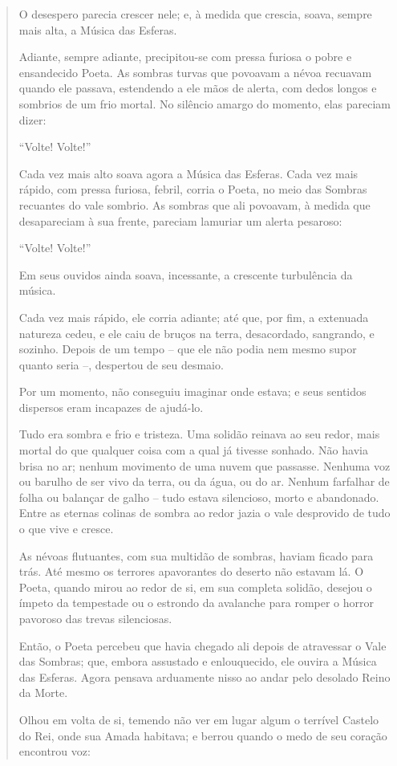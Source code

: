 \begin{verse}
O desespero parecia crescer nele; e, à medida que crescia, soava, sempre
mais alta, a Música das Esferas.

Adiante, sempre adiante, precipitou-se com pressa furiosa o pobre e
ensandecido Poeta. As sombras turvas que povoavam a névoa recuavam
quando ele passava, estendendo a ele mãos de alerta, com dedos longos e
sombrios de um frio mortal. No silêncio amargo do momento, elas pareciam
dizer:

``Volte! Volte!''

Cada vez mais alto soava agora a Música das Esferas. Cada vez mais
rápido, com pressa furiosa, febril, corria o Poeta, no meio das Sombras
recuantes do vale sombrio. As sombras que ali povoavam, à medida que
desapareciam à sua frente, pareciam lamuriar um alerta pesaroso:

``Volte! Volte!''

Em seus ouvidos ainda soava, incessante, a crescente turbulência da
música.

Cada vez mais rápido, ele corria adiante; até que, por fim, a extenuada
natureza cedeu, e ele caiu de bruços na terra, desacordado, sangrando, e
sozinho.
\smallskip
Depois de um tempo -- que ele não podia nem mesmo supor quanto seria --,
despertou de seu desmaio.

Por um momento, não conseguiu imaginar onde estava; e seus sentidos
dispersos eram incapazes de ajudá-lo.

Tudo era sombra e frio e tristeza. Uma solidão reinava ao seu redor,
mais mortal do que qualquer coisa com a qual já tivesse sonhado. Não
havia brisa no ar; nenhum movimento de uma nuvem que passasse. Nenhuma
voz ou barulho de ser vivo da terra, ou da água, ou do ar. Nenhum
farfalhar de folha ou balançar de galho -- tudo estava silencioso,
morto e abandonado. Entre as eternas colinas de sombra ao redor jazia o
vale desprovido de tudo o que vive e cresce.

As névoas flutuantes, com sua multidão de sombras, haviam ficado para
trás. Até mesmo os terrores apavorantes do deserto não estavam lá. O
Poeta, quando mirou ao redor de si, em sua completa solidão, desejou o
ímpeto da tempestade ou o estrondo da avalanche para romper o horror
pavoroso das trevas silenciosas.

Então, o Poeta percebeu que havia chegado ali depois de atravessar o
Vale das Sombras; que, embora assustado e enlouquecido, ele ouvira a
Música das Esferas. Agora pensava arduamente nisso ao andar pelo
desolado Reino da Morte.

Olhou em volta de si, temendo não ver em lugar algum o terrível Castelo
do Rei, onde sua Amada habitava; e berrou quando o medo de seu coração
encontrou voz:


\end{verse}
